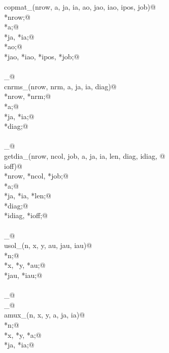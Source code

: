 \documentclass[12pt]{article}
\begin{document}
\begin{flushleft}
\begin{minipage}{\linewidth}
\begin{list}{}{}
\mbox{}\verb@int copmat_(nrow, a, ja, ia, ao, jao, iao, ipos, job)@\\
\mbox{}\verb@integer *nrow;@\\
\mbox{}\verb@doublereal *a;@\\
\mbox{}\verb@integer *ja, *ia;@\\
\mbox{}\verb@doublereal *ao;@\\
\mbox{}\verb@integer *jao, *iao, *ipos, *job;@\\
\mbox{}\verb@@\\
\mbox{}\verb@cnrms_@\\
\mbox{}\verb@int cnrms_(nrow, nrm, a, ja, ia, diag)@\\
\mbox{}\verb@integer *nrow, *nrm;@\\
\mbox{}\verb@doublereal *a;@\\
\mbox{}\verb@integer *ja, *ia;@\\
\mbox{}\verb@doublereal *diag;@\\
\mbox{}\verb@@\\
\mbox{}\verb@getdia_@\\
\mbox{}\verb@int getdia_(nrow, ncol, job, a, ja, ia, len, diag, idiag, @\\
\mbox{}\verb@        ioff)@\\
\mbox{}\verb@integer *nrow, *ncol, *job;@\\
\mbox{}\verb@doublereal *a;@\\
\mbox{}\verb@integer *ja, *ia, *len;@\\
\mbox{}\verb@doublereal *diag;@\\
\mbox{}\verb@integer *idiag, *ioff;@\\
\mbox{}\verb@@\\
\mbox{}\verb@usol_@\\
\mbox{}\verb@int usol_(n, x, y, au, jau, iau)@\\
\mbox{}\verb@integer *n;@\\
\mbox{}\verb@doublereal *x, *y, *au;@\\
\mbox{}\verb@integer *jau, *iau;@\\
\mbox{}\verb@@\\
\mbox{}\verb@dnaupd_@\\
\mbox{}\verb@amux_@\\
\mbox{}\verb@int amux_(n, x, y, a, ja, ia)@\\
\mbox{}\verb@integer *n;@\\
\mbox{}\verb@doublereal *x, *y, *a;@\\
\mbox{}\verb@integer *ja, *ia;@\\

\end{list}
\end{minipage}
\end{flushleft}
\end{document}
